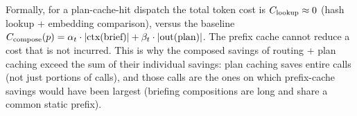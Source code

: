 Formally, for a plan-cache-hit dispatch the total token cost is
\(C_{\text{lookup}} \approx 0\) (hash lookup + embedding
comparison), versus the baseline
\(C_{\text{compose}}(p) = \alpha_{t} \cdot |\text{ctx}(\text{brief})| +
\beta_{t} \cdot |\text{out}(\text{plan})|\).  The prefix cache
cannot reduce a cost that is not incurred.  This is why the composed
savings of routing + plan caching exceed the sum of their individual
savings: plan caching saves entire calls (not just portions of calls),
and those calls are the ones on which prefix-cache savings would have
been largest (briefing compositions are long and share a common static
prefix).
